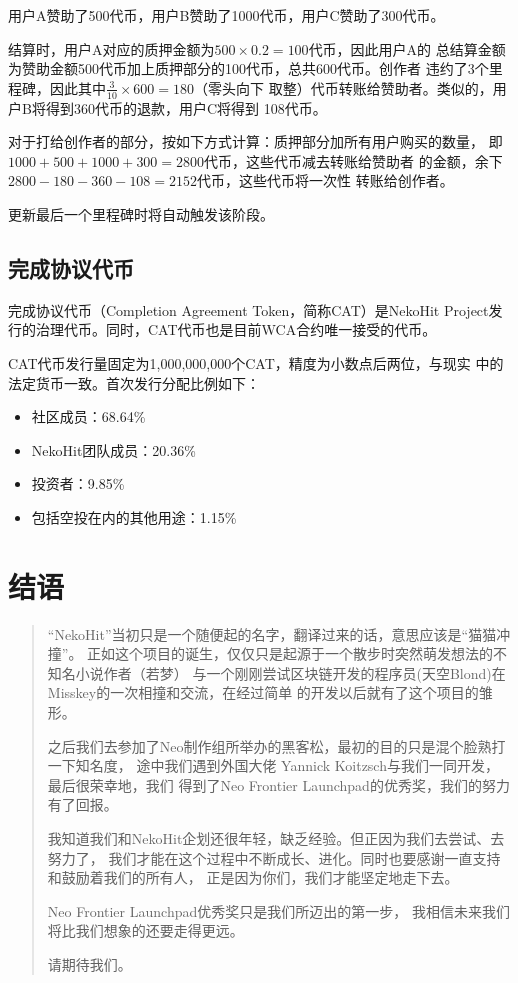 \documentclass[11pt,UTF8,a4paper]{ctexart}
\begin{document}
    用户A赞助了500代币，用户B赞助了1000代币，用户C赞助了300代币。

    结算时，用户A对应的质押金额为$500 \times 0.2 = 100$代币，因此用户A的
    总结算金额为赞助金额500代币加上质押部分的100代币，总共600代币。创作者
    违约了3个里程碑，因此其中$\frac{3}{10} \times 600 = 180$（零头向下
    取整）代币转账给赞助者。类似的，用户B将得到360代币的退款，用户C将得到
    108代币。

    对于打给创作者的部分，按如下方式计算：质押部分加所有用户购买的数量，
    即$1000 + 500 + 1000 + 300 = 2800$代币，这些代币减去转账给赞助者
    的金额，余下$2800 - 180 - 360 - 108 = 2152$代币，这些代币将一次性
    转账给创作者。

    更新最后一个里程碑时将自动触发该阶段。

    \subsection{完成协议代币}\label{subsec:cat}

    完成协议代币（Completion Agreement Token，简称CAT）是NekoHit
    Project发行的治理代币。同时，CAT代币也是目前WCA合约唯一接受的代币。

    CAT代币发行量固定为1,000,000,000个CAT，精度为小数点后两位，与现实
    中的法定货币一致。首次发行分配比例如下：

    \begin{itemize}
        \item 社区成员：68.64\%
        \item NekoHit团队成员：20.36\%
        \item 投资者：9.85\%
        \item 包括空投在内的其他用途：1.15\%
    \end{itemize}


    \section{结语}\label{sec:end}

    \begin{quotation}
        “NekoHit”当初只是一个随便起的名字，翻译过来的话，意思应该是“猫猫冲撞”。
        正如这个项目的诞生，仅仅只是起源于一个散步时突然萌发想法的不知名小说作者（若梦）
        与一个刚刚尝试区块链开发的程序员(天空Blond)在Misskey的一次相撞和交流，在经过简单
        的开发以后就有了这个项目的雏形。

        之后我们去参加了Neo制作组所举办的黑客松，最初的目的只是混个脸熟打一下知名度，
        途中我们遇到外国大佬 Yannick Koitzsch与我们一同开发，最后很荣幸地，我们
        得到了Neo Frontier Launchpad的优秀奖，我们的努力有了回报。

        我知道我们和NekoHit企划还很年轻，缺乏经验。但正因为我们去尝试、去努力了，
        我们才能在这个过程中不断成长、进化。同时也要感谢一直支持和鼓励着我们的所有人，
        正是因为你们，我们才能坚定地走下去。

        Neo Frontier Launchpad优秀奖只是我们所迈出的第一步，
        我相信未来我们将比我们想象的还要走得更远。

        请期待我们。

    \end{quotation}

    \clearpage

    
    
\end{document}
